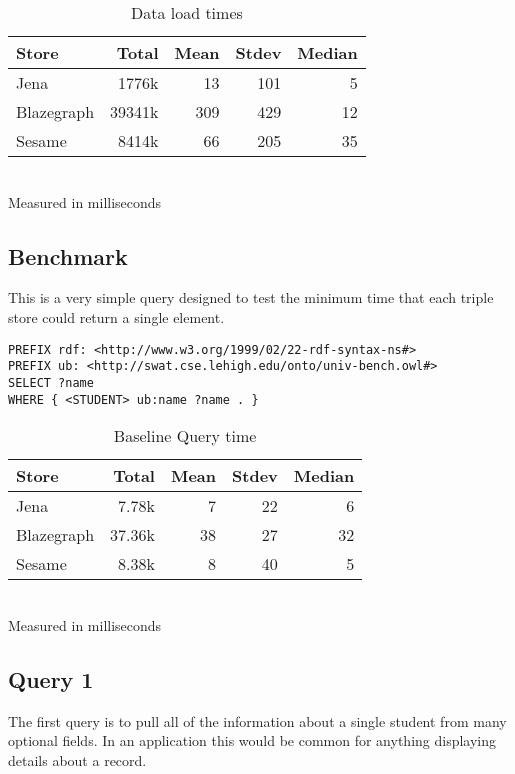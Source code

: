 \documentclass{llncs}
\begin{document}
\begin{table}
\begin{center}
\caption{Data load times}
\begin{tabular}{l | r r r r } Store & Total & Mean & Stdev & Median \\ \hline Jena & 1776k & 13 & 101 & 5 \\ Blazegraph & 39341k & 309 & 429 & 12 \\ Sesame & 8414k & 66 & 205 & 35 \end{tabular}
\\[5pt]
Measured in milliseconds
\end{center}
\end{table}

\subsection{Benchmark}

This is a very simple query designed to test the minimum time that each triple store could return a single element.

\begin{lstlisting}
PREFIX rdf: <http://www.w3.org/1999/02/22-rdf-syntax-ns#>
PREFIX ub: <http://swat.cse.lehigh.edu/onto/univ-bench.owl#>
SELECT ?name
WHERE { <STUDENT> ub:name ?name . }
\end{lstlisting}

\smallskip

\begin{table}
\begin{center}
\caption{Baseline Query time}
\begin{tabular}{l | r r r r } Store & Total & Mean & Stdev & Median \\ \hline Jena & 7.78k & 7 & 22 & 6 \\ Blazegraph & 37.36k & 38 & 27 & 32 \\ Sesame & 8.38k & 8 & 40 & 5 \end{tabular}
\\[5pt]
Measured in milliseconds
\end{center}
\end{table}

\subsection{Query 1}

The first query is to pull all of the information about a single student from many optional fields.  In an application this would be common for anything displaying details about a record.
\end{document}

